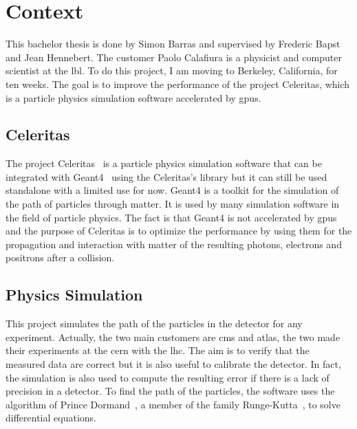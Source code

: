 \chapter{Context}
\label{spec:ch:context}

This bachelor thesis is done by Simon Barras and supervised by Frederic Bapst and Jean Hennebert.
The customer Paolo Calafiura is a physicist and computer scientist at the \acrfull{lbl}.
To do this project, I am moving to Berkeley, California, for ten weeks.
The goal is to improve the performance of the project Celeritas, which is a particle physics simulation software accelerated by \acrshort{gpu}s.




\section{Celeritas}
\label{spec:ch:context:celeritas}

The project Celeritas~\cite{Celeritas-Project} is a particle physics simulation software that can be integrated with Geant4~\cite{Geant4} using the Celeritas's library but it can still be used standalone with a limited use for now.
Geant4 is a toolkit for the simulation of the path of particles through matter.
It is used by many simulation software in the field of particle physics.
The fact is that Geant4 is not accelerated by \acrshort{gpu}s and the purpose of Celeritas is to optimize the performance by using them for the propagation and interaction with matter of the resulting photons, electrons and positrons after a collision.



\section{Physics Simulation}
\label{spec:ch:context:physics-simulation}

This project simulates the path of the particles in the detector for any experiment.
Actually, the two main customers are \acrshort{cms} and \acrshort{atlas}, the two made their experiments at the \acrfull{cern} with the \acrfull{lhc}.
The aim is to verify that the measured data are correct but it is also useful to calibrate the detector.
In fact, the simulation is also used to compute the resulting error if there is a lack of precision in a detector.
To find the path of the particles, the software uses the algorithm of Prince Dormand~\cite{princeDormand}, a member of the family Runge-Kutta~\cite{Runge-Kutta-methods}, to solve differential equations.

